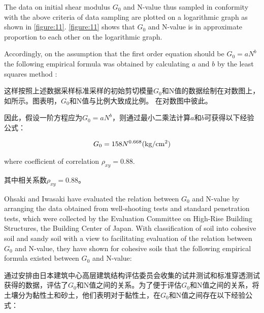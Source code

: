\begin{paracol}{2}
    
    The data on initial shear modulus $G_0$ and N-value thus sampled in conformity with the above criteria of data sampling are plotted on a logarithmic graph as shown in \autoref{figure:11}. \autoref{figure:11} shows that $G_0$ and N-value is in approximate proportion to each other on the logarithmic graph.

    Accordingly, on the assumption that the first order equation should be $G_0=aN^b$ the following empirical formula was obtained by calculating $a$ and $b$ by the least squares method :

    \switchcolumn

    这样按照上述数据采样标准采样的初始剪切模量$G_0$和N值的数据绘制在对数图上，如所示。图表明，$G_0$和N值与比例大致成比例。 在对数图中彼此。
       
    因此，假设一阶方程应为$G_0=aN^b$，则通过最小二乘法计算$a$和$b$可获得以下经验公式： 

\end{paracol}

\begin{align}
    G_0=158N^{0.668}(\rm{kg/cm^2})
    \label{equation:9}
\end{align}

\begin{paracol}{2}
    
    \noindent{}where coefficient of correlation $\rho_{xy}=0.88$. 

    \switchcolumn

    \noindent{}其中相关系数$\rho_{xy}=0.88$。

\end{paracol}


\begin{paracol}{2}
    
    Ohsaki and Iwasaki have evaluated the relation between $G_0$ and N-value by arranging the data obtained from well-shooting tests and standard penetration tests, which were collected by the Evaluation Committee on High-Rise Building Structures, the Building Center of Japan. With classification of soil into cohesive soil and sandy soil with a view to facilitating evaluation of the relation between $G_0$ and N-value, they have shown for cohesive soils that the following empirical formula existed between $G_0$ and N-value:

    \switchcolumn

    \citet{Ohsaki197361}通过安排由日本建筑中心高层建筑结构评估委员会收集的试井测试和标准穿透测试获得的数据，评估了$G_0$和N值之间的关系。为了便于评估$G_0$和N值之间的关系，将土壤分为黏性土和砂土，他们表明对于黏性土，在$G_0$和N值之间存在以下经验公式：

\end{paracol}


